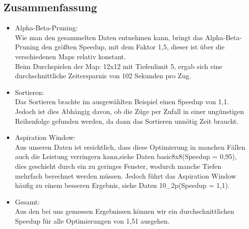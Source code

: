 \documentclass[12pt,a4paper,bibliography=totocnumbered,listof=totocnumbered]{scrartcl}
\begin{document}
\subsection{Zusammenfassung}
\begin{itemize}
\item Alpha-Beta-Pruning: \\
Wie man den gesammelten Daten entnehmen kann, bringt das Alpha-Beta-Pruning den größten Speedup, mit dem Faktor 1,5, dieser ist über die verschiedenen Maps relativ konstant.\\
Beim Durchspielen der Map: 12x12 mit Tiefenlimit 5, ergab sich eine durchschnittliche Zeitersparnis von 102 Sekunden pro Zug.
\item Sortieren:\\
Das Sortieren brachte im ausgewählten Beispiel einen Speedup von 1,1. Jedoch ist dies Abhängig davon, ob die Züge per Zufall in einer ungünstigen Reihenfolge gefunden werden, da dann das Sortieren unnötig Zeit braucht.
\item Aspiration Window:\\
Aus unseren Daten ist ersichtlich, dass diese Optimierung in manchen Fällen auch die Leistung verringern kann,siehe Daten basic8x8(Speedup = 0,95), dies geschieht durch ein zu geringes Fenster, wodurch manche Tiefen mehrfach berechnet werden müssen. Jedoch führt das Aspiration Window häufig zu einem besseren Ergebnis, siehe Daten 10\_2p(Speedup = 1,1).
\item Gesamt:\\
Aus den bei uns gemessen Ergebnissen können wir ein durchschnittlichen Speedup für alle Optimierungen von 1,51 ausgehen.

\end{itemize}
\end{document}
